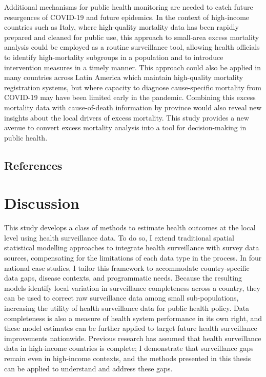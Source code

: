 \documentclass[
]{report}
\begin{document}
Additional mechanisms for public health monitoring are needed to catch future resurgences of COVID-19 and future epidemics. In the context of high-income countries such as Italy, where high-quality mortality data has been rapidly prepared and cleaned for public use, this approach to small-area excess mortality analysis could be employed as a routine surveillance tool, allowing health officials to identify high-mortality subgroups in a population and to introduce intervention measures in a timely manner. This approach could also be applied in many countries across Latin America which maintain high-quality mortality registration systems\autocite{Mikkelsen2015}, but where capacity to diagnose cause-specific mortality from COVID-19 may have been limited early in the pandemic\autocite{LeonCabrera2020}. Combining this excess mortality data with cause-of-death information by province would also reveal new insights about the local drivers of excess mortality. This study provides a new avenue to convert excess mortality analysis into a tool for decision-making in public health.

\hypertarget{references-4}{%
\section{References}\label{references-4}}

\printbibliography[segment=\therefsegment,heading=none]

\hypertarget{discussion-4}{%
\chapter{Discussion}\label{discussion-4}}

This study develops a class of methods to estimate health outcomes at the local level using health surveillance data. To do so, I extend traditional spatial statistical modelling approaches to integrate health surveillance with survey data sources, compensating for the limitations of each data type in the process. In four national case studies, I tailor this framework to accommodate country-specific data gaps, disease contexts, and programmatic needs. Because the resulting models identify local variation in surveillance completeness across a country, they can be used to correct raw surveillance data among small sub-populations, increasing the utility of health surveillance data for public health policy. Data completeness is also a measure of health system performance in its own right, and these model estimates can be further applied to target future health surveillance improvements nationwide. Previous research has assumed that health surveillance data in high-income countries is complete; I demonstrate that surveillance gaps remain even in high-income contexts, and the methods presented in this thesis can be applied to understand and address these gaps.
\end{document}
